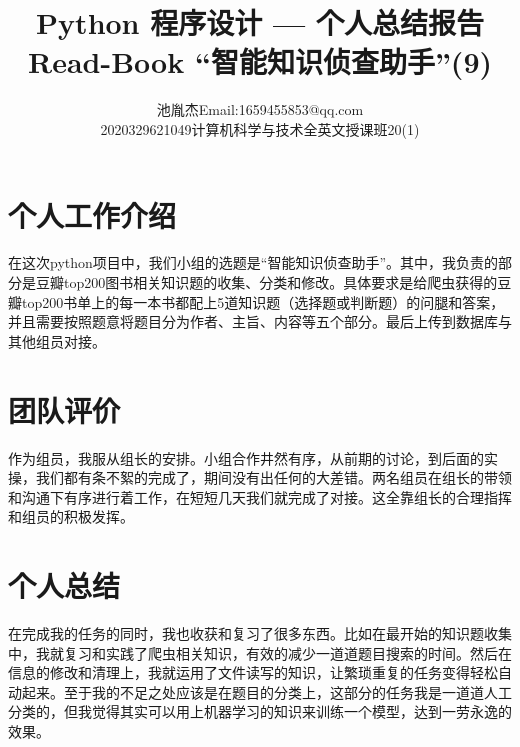 \documentclass[twoside,11pt]{article}
\makeatletter
\newcommand\studentName{池胤杰}
\newcommand\studentEmail{Email:1659455853@qq.com}
\newcommand\studentNumber{2020329621049}
\newcommand\studentClass{计算机科学与技术全英文授课班20(1)}
\makeatother
\begin{document}
\title{\Huge Python 程序设计 --- 个人总结报告 \\ \huge Read-Book ``智能知识侦查助手''(9) }

\author{\name \studentName \email \studentEmail \\
    \studentNumber \class  \studentClass
}

\maketitle

\section{个人工作介绍}
在这次python项目中，我们小组的选题是“智能知识侦查助手”。其中，我负责的部分是豆瓣top200图书相关知识题的收集、分类和修改。具体要求是给爬虫获得的豆瓣top200书单上的每一本书都配上5道知识题（选择题或判断题）的问腿和答案，并且需要按照题意将题目分为作者、主旨、内容等五个部分。最后上传到数据库与其他组员对接。

\section{团队评价}
作为组员，我服从组长的安排。小组合作井然有序，从前期的讨论，到后面的实操，我们都有条不絮的完成了，期间没有出任何的大差错。两名组员在组长的带领和沟通下有序进行着工作，在短短几天我们就完成了对接。这全靠组长的合理指挥和组员的积极发挥。

\section{个人总结}
在完成我的任务的同时，我也收获和复习了很多东西。比如在最开始的知识题收集中，我就复习和实践了爬虫相关知识，有效的减少一道道题目搜索的时间。然后在信息的修改和清理上，我就运用了文件读写的知识，让繁琐重复的任务变得轻松自动起来。至于我的不足之处应该是在题目的分类上，这部分的任务我是一道道人工分类的，但我觉得其实可以用上机器学习的知识来训练一个模型，达到一劳永逸的效果。

\thispagestyle{empty}
\end{document}
